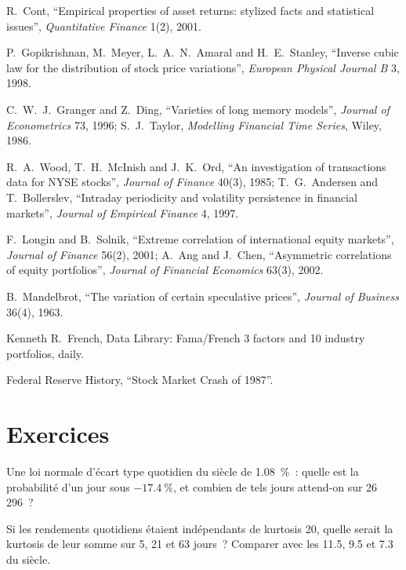 \begin{omsources}
\item R.~Cont, ``Empirical properties of asset returns: stylized facts and statistical issues'', \emph{Quantitative Finance} 1(2),
2001.
\item P.~Gopikrishnan, M.~Meyer, L.~A.~N.~Amaral and H.~E.~Stanley, ``Inverse cubic law for the distribution of stock price
variations'', \emph{European Physical Journal B} 3, 1998.
\item C.~W.~J.~Granger and Z.~Ding, ``Varieties of long memory models'', \emph{Journal of Econometrics} 73, 1996; S.~J.~Taylor,
\emph{Modelling Financial Time Series}, Wiley, 1986.
\item R.~A.~Wood, T.~H.~McInish and J.~K.~Ord, ``An investigation of transactions data for NYSE stocks'', \emph{Journal of Finance}
40(3), 1985; T.~G.~Andersen and T.~Bollerslev, ``Intraday periodicity and volatility persistence in financial markets'',
\emph{Journal of Empirical Finance} 4, 1997.
\item F.~Longin and B.~Solnik, ``Extreme correlation of international equity markets'', \emph{Journal of Finance} 56(2), 2001;
A.~Ang and J.~Chen, ``Asymmetric correlations of equity portfolios'', \emph{Journal of Financial Economics} 63(3), 2002.
\item B.~Mandelbrot, ``The variation of certain speculative prices'', \emph{Journal of Business} 36(4), 1963.
\item Kenneth R.~French, Data Library: Fama/French 3 factors and 10 industry portfolios, daily.
\item Federal Reserve History, ``Stock Market Crash of 1987''.
\end{omsources}

\section{Exercices}

\begin{exercise}[$\star$]\label{exo:rs:stylised-facts-of-returns:1}
Une loi normale d'écart type quotidien du siècle de 1.08~\%~: quelle est la probabilité d'un jour sous $-17.4~\%$, et combien de tels jours
attend-on sur 26\,296~?
\end{exercise}

\begin{exercise}[$\star$]\label{exo:rs:stylised-facts-of-returns:2}
Si les rendements quotidiens étaient indépendants de kurtosis 20, quelle serait la kurtosis de leur somme sur 5, 21 et 63 jours~? Comparer avec les
11.5, 9.5 et 7.3 du siècle.
\end{exercise}

